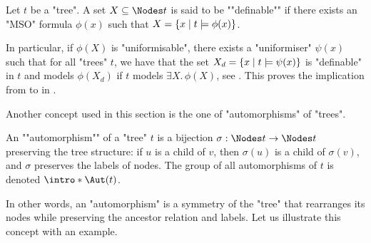 \documentclass[a4paper,UKenglish,cleveref, autoref, thm-restate]{lipics-v2021}
\begin{document}
\begin{definition}\label{def:definable}
	\AP Let $t$ be a "tree". A set $X \subseteq \Nodes t$ is said to be ""definable"" if there exists an
	"MSO" formula $\phi(x)$ such that $X = \left\{x \mid t \models \phi(x)\right\}$.
\end{definition}

In particular, if $\phi(X)$ is "uniformisable", there exists a "uniformiser" $\psi(x)$ such that for all "trees" $t$,
we have that the set $X_d = \left\{x \mid t \models \psi(x)\right\}$ is "definable" in $t$ and models $\phi(X_d)$ if $t$ models $\exists X.\, \phi(X)$,
see .
This proves the implication from  to  in .

Another concept used in this section is the one of "automorphisms" of "trees".
\begin{definition}["automorphism"]\label{def:automorphism}
	\AP An ""automorphism"" of a "tree" $t$ is a bijection $\sigma : \Nodes t \to \Nodes t$ preserving the tree structure:
	if $u$ is a child of $v$, then $\sigma(u)$ is a child of $\sigma(v)$, and $\sigma$ preserves the labels of nodes.
	The group of all automorphisms of $t$ is denoted $\intro* \Aut(t)$.
\end{definition}

In other words, an "automorphism" is a symmetry of the "tree" that rearranges its nodes while preserving the ancestor relation and labels.
Let us illustrate this concept with an example.
\end{document}
